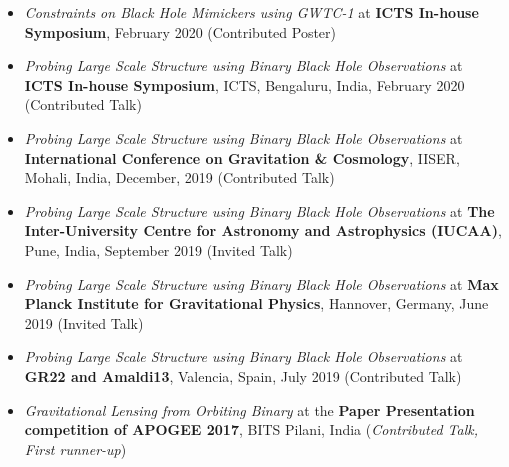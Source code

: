 \documentclass[11pt, margin, centered, letterpaper]{res}
\begin{document}
\begin{resume}
\begin{itemize}[leftmargin=*]
	 \item \textit{Constraints on Black Hole Mimickers using GWTC-1} at \textbf{ICTS In-house Symposium}, February 2020 (Contributed Poster)
	 \item \textit{Probing Large Scale Structure using Binary Black Hole Observations} at \textbf{ICTS In-house Symposium}, ICTS, Bengaluru, India, February 2020 (Contributed Talk)
	 \item \textit{Probing Large Scale Structure using Binary Black Hole Observations} at \textbf{International Conference on Gravitation \& Cosmology}, IISER, Mohali, India, December, 2019 (Contributed Talk)
	 \item \textit{Probing Large Scale Structure using Binary Black Hole Observations} at \textbf{The Inter-University Centre for Astronomy and Astrophysics (IUCAA)}, Pune, India, September 2019 (Invited Talk)
	 \item \textit{Probing Large Scale Structure using Binary Black Hole Observations} at \textbf{Max Planck Institute for Gravitational Physics}, Hannover, Germany, June 2019 (Invited Talk)
	\item \textit{Probing Large Scale Structure using Binary Black Hole Observations} at \textbf{GR22 and Amaldi13}, Valencia, Spain, July 2019 (Contributed Talk)
	\item \textit{Gravitational Lensing from Orbiting Binary} at the \textbf{Paper Presentation competition of APOGEE 2017}, BITS Pilani, India (\textit{Contributed Talk, First runner-up})

\end{itemize}


\end{resume}
\end{document}
